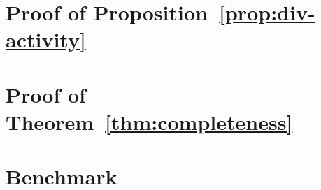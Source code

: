 
\appendix

\section{Proof of Proposition~\ref{prop:div-activity}}\label{ap:div-activity}



\section{Proof of Theorem~\ref{thm:completeness}}\label{ap:completeness}



\section{Benchmark}\label{ap:benchmark}




%
